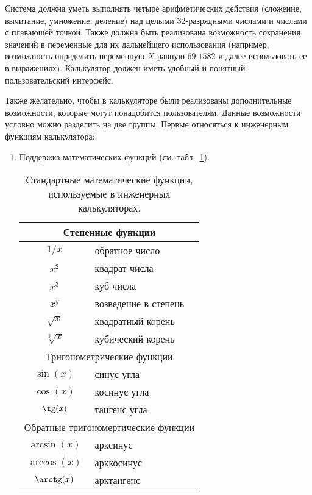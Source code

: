 Система должна уметь выполнять четыре  арифметических действия 
(сложение, вычитание, умножение, деление) над целыми 32-разрядными 
числами и числами с плавающей точкой. Также должна быть реализована 
возможность сохранения значений в переменные для их дальнейщего 
использования (например, возможность определить переменную 
$X$ равную $69.1582$ и далее использовать ее в выражениях). 
Калькулятор должен иметь удобный и понятный пользовательский интерфейс.

Также желательно, чтобы в калькуляторе были реализованы 
дополнительные возможности, которые могут понадобится пользователям.
Данные возможности условно можно разделить на две группы.
Первые относяться к инженерным функциям калькулятора:

\begin{enumerate}
  \item Поддержка математических функций (см. табл.~\ref{tab:1}).
    
\begin{table}
\caption{Стандартные математические функции, 
используемые в инженерных калькуляторах.}\label{tab:1}
\renewcommand{\arraystretch}{1.3}
\begin{tabular}{|c|l|}
 \hline
 \multicolumn{2}{|c|}{Степенные функции}
 \\ \hline
 $1/x$    & обратное число
 \\ \hline
 $x^2$    & квадрат числа
 \\ \hline
 $x^3$    & куб числа
 \\ \hline
 $x^y$    & возведение в степень
 \\ \hline
 $\sqrt{x}$& квадратный корень
 \\ \hline
 $\sqrt[3]{x}$ & кубический корень
 \\ \hline
 
 \multicolumn{2}{|c|}{Тригонометрические функции}
 \\ \hline
 $\sin(x)$ & синус угла
 \\ \hline
 $\cos(x)$ & косинус угла
 \\ \hline
 $\tg(x)$  & тангенс угла
 \\ \hline
 
 \multicolumn{2}{|c|}{Обратные тригономертические функции}
 \\ \hline
 $\arcsin(x)$ & арксинус
 \\ \hline
 $\arccos(x)$ & арккосинус
 \\ \hline
 $\arctg(x)$  & арктангенс
 \\ \hline
 

\end{tabular}
\end{table}
\end{enumerate}
